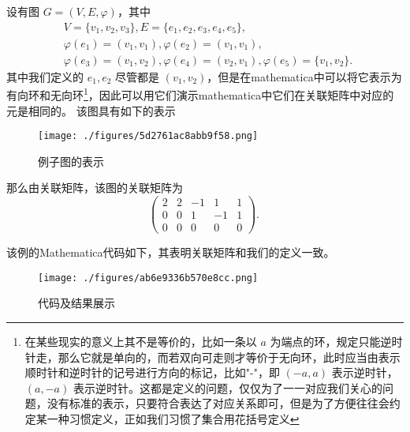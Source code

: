 \begin{example}{}\label{ex_RepGra_1}
设有图 $G=(V,E,\varphi)$，其中
 \begin{equation}
 \begin{aligned}
  &V=\{v_1,v_2,v_3\},E=\{e_1,e_2,e_3,e_4,e_5\},\\
 &\varphi(e_1)=(v_1,v_1), \varphi(e_2)=(v_1,v_1), \\
 &\varphi(e_3)=(v_1,v_2), \varphi(e_4)=(v_2,v_1),\varphi(e_5)=\{v_1,v_2\}.
 \end{aligned}~
 \end{equation}
 其中我们定义的 $e_1,e_2$ 尽管都是 $(v_1,v_2)$，但是在mathematica中可以将它表示为有向环和无向环\footnote{在某些现实的意义上其不是等价的，比如一条以 $a$ 为端点的环，规定只能逆时针走，那么它就是单向的，而若双向可走则才等价于无向环，此时应当由表示顺时针和逆时针的记号进行方向的标记，比如"-"，即 $(-a,a)$ 表示逆时针，$(a,-a)$ 表示逆时针。这都是定义的问题，仅仅为了一一对应我们关心的问题，没有标准的表示，只要符合表达了对应关系即可，但是为了方便往往会约定某一种习惯定义，正如我们习惯了集合用花括号定义}，因此可以用它们演示mathematica中它们在关联矩阵中对应的元是相同的。
 该图具有如下的表示
\begin{figure}[ht]
\centering
\texttt{[image: ./figures/5d2761ac8abb9f58.png]}
\caption{例子图的表示} \label{fig_RepGra_2}
\end{figure} 
那么由关联矩阵，该图的关联矩阵为
\begin{equation}
\begin{pmatrix}
2&2&-1&1&1\\
0&0&1&-1&1\\
0&0&0&0&0
\end{pmatrix}.~
\end{equation}

该例的Mathematica代码如下，其表明关联矩阵和我们的定义一致。
\begin{figure}[ht]
\centering
\texttt{[image: ./figures/ab6e9336b570e8cc.png]}
\caption{代码及结果展示} \label{fig_RepGra_1}
\end{figure}

\end{example}

